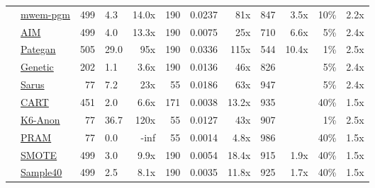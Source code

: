\begin{table}
\begin{tabular}{llrlr@{\hskip 10pt}r@{\hskip 6pt}l@{\hskip 6pt}r@{\hskip 10pt}r@{\hskip 6pt}r@{\hskip 6pt}r@{\hskip 6pt}r}
        \cellcolor{ForestGreen} & \href{https://htmlpreview.github.io/?https://github.com/yoid2000/sdnist-summary/blob/main/results/mwem_pgm/report.html}{mwem-pgm} & 499 & 4.3 & 14.0x & 190 & 0.0237 & 81x & 847 & 3.5x & 10\% & 2.2x \\
        \cellcolor{ForestGreen} & \href{https://htmlpreview.github.io/?https://github.com/yoid2000/sdnist-summary/blob/main/results/aim_e_10_all/report.html}{AIM} & 499 & 4.0 & 13.3x & 190 & 0.0075 & 25x & 710 & 6.6x & 5\% & 2.4x \\
        \cellcolor{ForestGreen} & \href{https://htmlpreview.github.io/?https://github.com/yoid2000/sdnist-summary/blob/main/results/pategan_n_iter_50_e_10_all/report.html}{Pategan} & 505 & 29.0 & 95x & 190 & 0.0336 & 115x & 544 & 10.4x & 1\% & 2.5x \\
        \cellcolor{YellowGreen} & \href{https://htmlpreview.github.io/?https://github.com/yoid2000/sdnist-summary/blob/main/results/genetic_sd_e_10_simple/report.html}{Genetic} & 202 & 1.1 & 3.6x & 190 & 0.0136 & 46x & 826 &   & 5\% & 2.4x \\
        \cellcolor{YellowGreen} & \href{https://htmlpreview.github.io/?https://github.com/yoid2000/sdnist-summary/blob/main/results/sarus_sdg_demographic/report.html}{Sarus} & 77 & 7.2 & 23x & 55 & 0.0186 & 63x & 947 &   & 5\% & 2.4x \\
        \cellcolor{SkyBlue} & \href{https://htmlpreview.github.io/?https://github.com/yoid2000/sdnist-summary/blob/main/results/cart_cf21/report.html}{CART} & 451 & 2.0 & 6.6x & 171 & 0.0038 & 13.2x & 935 &   & 40\% & 1.5x \\
        \cellcolor{Salmon} & \href{https://htmlpreview.github.io/?https://github.com/yoid2000/sdnist-summary/blob/main/results/k_anonymity_k_6/report.html}{K6-Anon} & 77 & 36.7 & 120x & 55 & 0.0127 & 43x & 907 &   & 1\% & 2.5x \\
        \cellcolor{Goldenrod} & \href{https://htmlpreview.github.io/?https://github.com/yoid2000/sdnist-summary/blob/main/results/pram_default/report.html}{PRAM} & 77 & 0.0 & -inf & 55 & 0.0014 & 4.8x & 986 &   & 40\% & 1.5x \\
        \cellcolor{Tan} & \href{https://htmlpreview.github.io/?https://github.com/yoid2000/sdnist-summary/blob/main/results/smote_target_marital/report.html}{SMOTE} & 499 & 3.0 & 9.9x & 190 & 0.0054 & 18.4x & 915 & 1.9x & 40\% & 1.5x \\
        \cellcolor{Tan} & \href{https://htmlpreview.github.io/?https://github.com/yoid2000/sdnist-summary/blob/main/results/subsample_40pcnt_all/report.html}{Sample40} & 499 & 2.5 & 8.1x & 190 & 0.0035 & 11.8x & 925 & 1.7x & 40\% & 1.5x \\
        \bottomrule
    \end{tabular}
\end{table}
